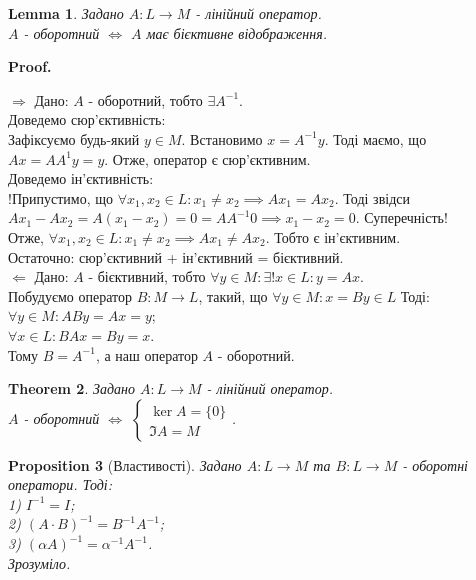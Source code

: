 \documentclass[a4paper, 10pt]{article}
\makeatletter
\def\rightproof{$\boxed{\Rightarrow}$ }
\def\leftproof{$\boxed{\Leftarrow}$ }
\theoremstyle{theoremdd}
\newtheorem{theorem}{Theorem}[subsection]
\newtheorem{proposition}[theorem]{Proposition}
\newtheorem{lemma}[theorem]{Lemma}
\renewenvironment{proof}[1][Proof.\\]{\par
\pushQED{\hfill \qed}%
\normalfont \topsep6\p@\@plus6\p@\relax
\trivlist
\item\relax
{\bfseries
#1\@addpunct{.}}\hspace\labelsep\ignorespaces
}{%
\popQED\endtrivlist\@endpefalse
}
\makeatother
\begin{document}
	\begin{lemma}
	Задано $A: L \to M$ - лінійний оператор.\\
	$A$ - оборотний $\iff$ $A$ має бієктивне відображення.
	\end{lemma}
	
	\begin{proof}
	\rightproof Дано: $A$ - оборотний, тобто $\exists A^{-1}$.\\
	Доведемо сюр'єктивність:\\
	Зафіксуємо будь-який $y \in M$. Встановимо $x = A^{-1}y$. Тоді маємо, що $Ax = AA^{1}y = y$. Отже, оператор є сюр'єктивним.\\
	Доведемо ін'єктивність:\\
	!Припустимо, що $\forall x_1,x_2 \in L: x_1 \neq x_2 \implies Ax_1 = Ax_2$. Тоді звідси $Ax_1 - Ax_2 = A(x_1-x_2)=0=AA^{-1}0 \implies x_1 - x_2 = 0$. Суперечність! \\
	Отже, $\forall x_1,x_2 \in L: x_1 \neq x_2 \implies Ax_1 \neq Ax_2$. Тобто є ін'єктивним.\\
	Остаточно: сюр'єктивний + ін'єктивний = бієктивний.
	\bigskip \\
	\leftproof Дано: $A$ - бієктивний, тобто $\forall y \in M: \exists! x \in L: y=  Ax$.\\
	Побудуємо оператор $B: M \to L$, такий, що $\forall y \in M: x = By \in L$ Тоді:\\
	$\forall y \in M: ABy = Ax = y$;\\
	$\forall x \in L: BAx = By = x$.\\
	Тому $B = A^{-1}$, а наш оператор $A$ - оборотний.
	\end{proof}
	
	\begin{theorem}
	Задано $A: L \to M$ - лінійний оператор.\\
	$A$ - оборотний $\iff$ $\begin{cases} \ker A = \{0\} \\ \Im A = M \end{cases}$.
	\end{theorem}
	
	\begin{proposition}[Властивості]
	Задано $A: L \to M$ та $B: L \to M$ - оборотні оператори. Тоді:\\
	1) $I^{-1} = I$;\\
	2) $(A \cdot B)^{-1} = B^{-1} A^{-1}$;\\
	3) $(\alpha A)^{-1} = \alpha^{-1} A^{-1}$.\\
	\textit{Зрозуміло.}
	\end{proposition}
	
\end{document}

